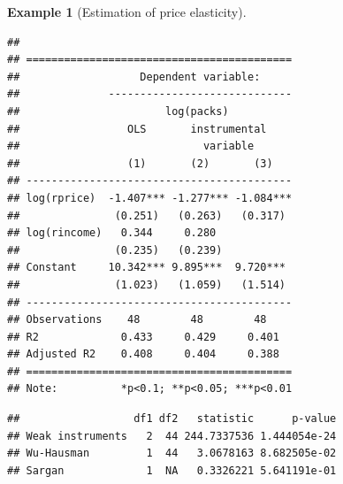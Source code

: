\documentclass[
  12pt,
]{book}
\newenvironment{Shaded}{\begin{snugshade}}{\end{snugshade}}
\newcommand{\AttributeTok}[1]{\textcolor[rgb]{0.77,0.63,0.00}{#1}}
\newcommand{\ConstantTok}[1]{\textcolor[rgb]{0.00,0.00,0.00}{#1}}
\newcommand{\FunctionTok}[1]{\textcolor[rgb]{0.00,0.00,0.00}{#1}}
\newcommand{\NormalTok}[1]{#1}
\newcommand{\SpecialCharTok}[1]{\textcolor[rgb]{0.00,0.00,0.00}{#1}}
\theoremstyle{definition}
\theoremstyle{definition}
\newtheorem{example}{Example}[chapter]
\theoremstyle{definition}
\theoremstyle{definition}
\theoremstyle{remark}
\begin{document}
\begin{example}[Estimation of price elasticity]
\begin{verbatim}
## 
## ==========================================
##                   Dependent variable:     
##              -----------------------------
##                       log(packs)          
##                 OLS       instrumental    
##                             variable      
##                 (1)       (2)       (3)   
## ------------------------------------------
## log(rprice)  -1.407*** -1.277*** -1.084***
##               (0.251)   (0.263)   (0.317) 
## log(rincome)   0.344     0.280            
##               (0.235)   (0.239)           
## Constant     10.342*** 9.895***  9.720*** 
##               (1.023)   (1.059)   (1.514) 
## ------------------------------------------
## Observations    48        48        48    
## R2             0.433     0.429     0.401  
## Adjusted R2    0.408     0.404     0.388  
## ==========================================
## Note:          *p<0.1; **p<0.05; ***p<0.01
\end{verbatim}

\begin{Shaded}
\end{Shaded}

\begin{verbatim}
##                  df1 df2   statistic      p-value
## Weak instruments   2  44 244.7337536 1.444054e-24
## Wu-Hausman         1  44   3.0678163 8.682505e-02
## Sargan             1  NA   0.3326221 5.641191e-01
\end{verbatim}

\end{example}
\end{document}
